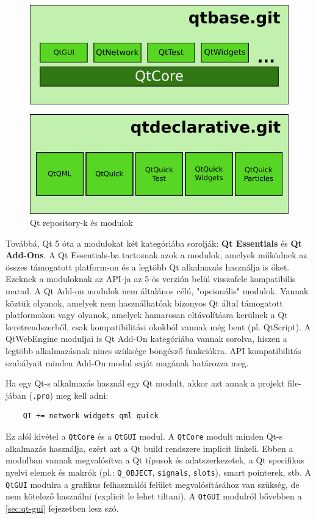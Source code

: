 \documentclass[12pt]{report}
\begin{document}
\begin{figure}[h]
    \centering
    \includegraphics[scale=.66]{qt-repos-and-modules}
    \caption{
        \label{fig:qt-repos-and-modules}
        Qt repository-k és modulok
    }
\end{figure}

Továbbá, Qt 5 óta a modulokat két kategóriába sorolják: \textbf{Qt Essentials} és
\textbf{Qt Add-Ons}. A Qt Essentials-ba tartoznak azok a modulok, amelyek működnek az
összes támogatott platform-on és a legtöbb Qt alkalmazás használja is őket. Ezeknek a
moduloknak az API-ja az 5-ös verzión belül visszafele kompatibilis marad.
A Qt Add-on modulok nem általános célú, "opcionális" modulok. Vannak köztük olyanok,
amelyek nem használhatóak bizonyos Qt által támogatott platformokon vagy olyanok, amelyek
hamarosan eltávolításra kerülnek a Qt keretrendszerből, csak kompatibilitási okokból vannak
még bent (pl. QtScript). A QtWebEngine moduljai is Qt Add-On kategóriába vannak sorolva,
hiszen a legtöbb alkalmazásnak nincs szüksége böngésző funkciókra. API kompatibilitás
szabályait minden Add-On modul saját magának határozza meg.
\cite{bib:qt-doc-qtmodules}

Ha egy Qt-s alkalmazás használ egy Qt modult, akkor azt annak a projekt file-jában
(\texttt{.pro}) meg kell adni:
\begin{verbatim}
    QT += network widgets qml quick
\end{verbatim}
Ez alól kivétel a \texttt{QtCore} és a \texttt{QtGUI} modul. A \texttt{QtCore} modult
minden Qt-s alkalmazás használja, ezért azt a Qt build rendszere implicit linkeli.
Ebben a modulban vannak megvalósítva a Qt típusok és adatszerkezetek, a Qt specifikus nyelvi
elemek és makrók (pl.: \texttt{Q\_OBJECT}, \texttt{signals}, \texttt{slots}),
smart pointerek, stb. A \texttt{QtGUI} modulra a grafikus felhasználói felület
megvalósításához van szükség, de nem kötelező használni (explicit le lehet tiltani).
A \texttt{QtGUI} modulról bővebben a \ref{sec:qt-gui} fejezetben lesz szó.
\end{document}
